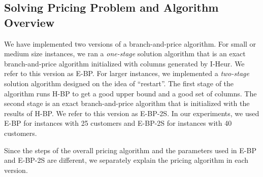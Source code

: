 \subsection{Solving Pricing Problem and Algorithm Overview}
\label{sec:alg-view}
We have implemented two versions of a branch-and-price algorithm. 
For small or medium size instances, we ran a {\em one-stage}
solution algorithm that is an exact branch-and-price algorithm 
initialized with columns generated by I-Heur. We refer to
this version as E-BP. For larger instances,
we implemented a {\em two-stage} solution algorithm designed
on the idea of ``restart''. 
The first stage of the algorithm runs H-BP to get a good upper bound and
a good set of columns. The second stage is an exact branch-and-price algorithm 
that is initialized with the results of H-BP. We refer to this version 
as E-BP-2S. In our experiments, we used E-BP for instances with 25 customers and 
E-BP-2S for instances with 40 customers.

Since the steps of the overall pricing algorithm and the parameters used in E-BP and 
E-BP-2S are different, we separately explain the pricing algorithm in each version.

